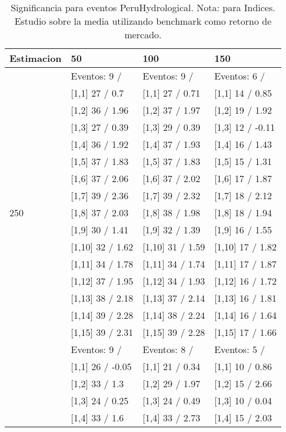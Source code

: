 \begin{table}

\caption{Significancia para eventos PeruHydrological. Nota: para Indices. Estudio sobre la media utilizando benchmark como retorno de mercado.}
\centering
\begin{tabular}[t]{llll}
\toprule
Estimacion & 50 & 100 & 150\\
\midrule
 & Eventos:  9 / & Eventos:  9 / & Eventos:  6 /\\
 & {}[1,1] 27  / 0.7 & {}[1,1] 27  / 0.71 & {}[1,1] 14  / 0.85\\
 & {}[1,2] 36  / 1.96 & {}[1,2] 37  / 1.97 & {}[1,2] 19  / 1.92\\
 & {}[1,3] 27  / 0.39 & {}[1,3] 29  / 0.39 & {}[1,3] 12  / -0.11\\
 & {}[1,4] 36  / 1.92 & {}[1,4] 37  / 1.93 & {}[1,4] 16  / 1.43\\
\addlinespace
 & {}[1,5] 37  / 1.83 & {}[1,5] 37  / 1.83 & {}[1,5] 15  / 1.31\\
 & {}[1,6] 37  / 2.06 & {}[1,6] 37  / 2.02 & {}[1,6] 17  / 1.87\\
 & {}[1,7] 39  / 2.36 & {}[1,7] 39  / 2.32 & {}[1,7] 18  / 2.12\\
250 & {}[1,8] 37  / 2.03 & {}[1,8] 38  / 1.98 & {}[1,8] 18  / 1.94\\
 & {}[1,9] 30  / 1.41 & {}[1,9] 32  / 1.39 & {}[1,9] 16  / 1.55\\
\addlinespace
 & {}[1,10] 32  / 1.62 & {}[1,10] 31  / 1.59 & {}[1,10] 17  / 1.82\\
 & {}[1,11] 34  / 1.78 & {}[1,11] 34  / 1.74 & {}[1,11] 17  / 1.87\\
 & {}[1,12] 37  / 1.95 & {}[1,12] 34  / 1.93 & {}[1,12] 16  / 1.72\\
 & {}[1,13] 38  / 2.18 & {}[1,13] 37  / 2.14 & {}[1,13] 16  / 1.81\\
 & {}[1,14] 39  / 2.28 & {}[1,14] 38  / 2.24 & {}[1,14] 16  / 1.64\\
\addlinespace
 & {}[1,15] 39  / 2.31 & {}[1,15] 39  / 2.28 & {}[1,15] 17  / 1.66\\
 & Eventos:  9 / & Eventos:  8 / & Eventos:  5 /\\
 & {}[1,1] 26  / -0.05 & {}[1,1] 21  / 0.34 & {}[1,1] 10  / 0.86\\
 & {}[1,2] 33  / 1.3 & {}[1,2] 29  / 1.97 & {}[1,2] 15  / 2.66\\
 & {}[1,3] 24  / 0.25 & {}[1,3] 24  / 0.49 & {}[1,3] 10  / 0.04\\
\addlinespace
 & {}[1,4] 33  / 1.6 & {}[1,4] 33  / 2.73 & {}[1,4] 15  / 2.03\\

\end{tabular}
\end{table}
